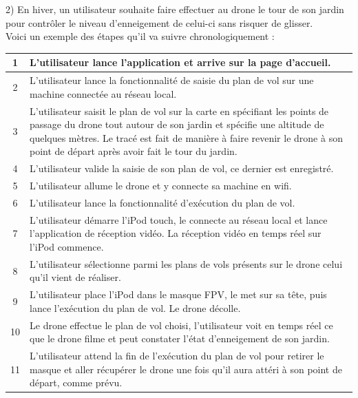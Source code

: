 \documentclass{article}
\begin{document}
        \newpage
         \begin{flushleft}
        2) En hiver, un utilisateur souhaite faire effectuer au drone le tour de son jardin pour contrôler le niveau d'enneigement de celui-ci sans risquer de glisser.\\
        Voici un exemple des étapes qu'il va suivre chronologiquement : \\
         \end{flushleft}
	    \begin{center}
	    \renewcommand{\arraystretch}{2}
        \begin{tabularx}{15cm}{|c|X|}
            \hline
            1 & L'utilisateur lance l'application et arrive sur la page d'accueil.\\
            \hline
            2 & L'utilisateur lance la fonctionnalité de saisie du plan de vol sur une machine connectée au réseau local.\\
            \hline
            3 & L'utilisateur saisit le plan de vol sur la carte en spécifiant les points de passage du drone tout autour de son jardin et spécifie une altitude de quelques mètres. Le tracé est fait de manière à faire revenir le drone à son point de départ après avoir fait le tour du jardin. \\
            \hline
            4 & L'utilisateur valide la saisie de son plan de vol, ce dernier est enregistré. \\
            \hline
            5 & L'utilisateur allume le drone et y connecte sa machine en wifi. \\
            \hline
            6 & L'utilisateur lance la fonctionnalité d'exécution du plan de vol. \\
            \hline
            7 &  L'utilisateur démarre l'iPod touch, le connecte au réseau local et lance l'application de réception vidéo. La réception vidéo en temps réel sur l'iPod commence.\\
            \hline
            8 & L'utilisateur sélectionne parmi les plans de vols présents sur le drone celui qu'il vient de réaliser. \\
            \hline
            9 & L'utilisateur place l'iPod dans le masque FPV, le met sur sa tête, puis lance l'exécution du plan de vol. Le drone décolle. \\
            \hline
            10 & Le drone effectue le plan de vol choisi, l'utilisateur voit en temps réel ce que le drone filme et peut constater l'état d'enneigement de son jardin. \\
            \hline
            11 & L'utilisateur attend la fin de l'exécution du plan de vol pour retirer le masque et aller récupérer le drone une fois qu'il aura attéri à son point de départ, comme prévu.\\
            \hline
        \end{tabularx}
        \end{center}
        
\end{document}
